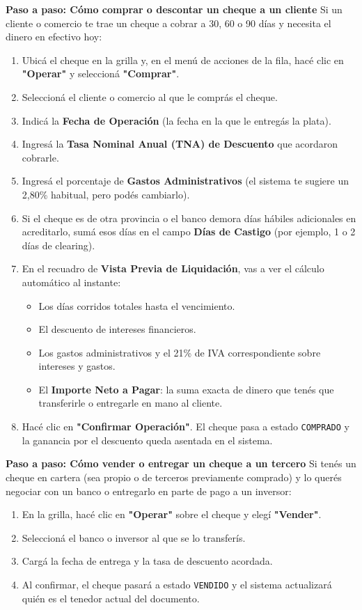 \documentclass[12pt,a4paper]{article}
\renewcommand{\_}{\textunderscore\allowbreak}
\begin{document}
\textbf{Paso a paso: Cómo comprar o descontar un cheque a un cliente}
Si un cliente o comercio te trae un cheque a cobrar a 30, 60 o 90 días y necesita el dinero en efectivo hoy:
\begin{enumerate}
    \item Ubicá el cheque en la grilla y, en el menú de acciones de la fila, hacé clic en \textbf{"Operar"} y seleccioná \textbf{"Comprar"}.
    \item Seleccioná el cliente o comercio al que le comprás el cheque.
    \item Indicá la \textbf{Fecha de Operación} (la fecha en la que le entregás la plata).
    \item Ingresá la \textbf{Tasa Nominal Anual (TNA) de Descuento} que acordaron cobrarle.
    \item Ingresá el porcentaje de \textbf{Gastos Administrativos} (el sistema te sugiere un 2,80\% habitual, pero podés cambiarlo).
    \item Si el cheque es de otra provincia o el banco demora días hábiles adicionales en acreditarlo, sumá esos días en el campo \textbf{Días de Castigo} (por ejemplo, 1 o 2 días de clearing).
    \item En el recuadro de \textbf{Vista Previa de Liquidación}, vas a ver el cálculo automático al instante:
          \begin{itemize}
              \item Los días corridos totales hasta el vencimiento.
              \item El descuento de intereses financieros.
              \item Los gastos administrativos y el 21\% de IVA correspondiente sobre intereses y gastos.
              \item El \textbf{Importe Neto a Pagar}: la suma exacta de dinero que tenés que transferirle o entregarle en mano al cliente.
          \end{itemize}
    \item Hacé clic en \textbf{"Confirmar Operación"}. El cheque pasa a estado \texttt{COMPRADO} y la ganancia por el descuento queda asentada en el sistema.
\end{enumerate}

\textbf{Paso a paso: Cómo vender o entregar un cheque a un tercero}
Si tenés un cheque en cartera (sea propio o de terceros previamente comprado) y lo querés negociar con un banco o entregarlo en parte de pago a un inversor:
\begin{enumerate}
    \item En la grilla, hacé clic en \textbf{"Operar"} sobre el cheque y elegí \textbf{"Vender"}.
    \item Seleccioná el banco o inversor al que se lo transferís.
    \item Cargá la fecha de entrega y la tasa de descuento acordada.
    \item Al confirmar, el cheque pasará a estado \texttt{VENDIDO} y el sistema actualizará quién es el tenedor actual del documento.
\end{enumerate}
\end{document}
